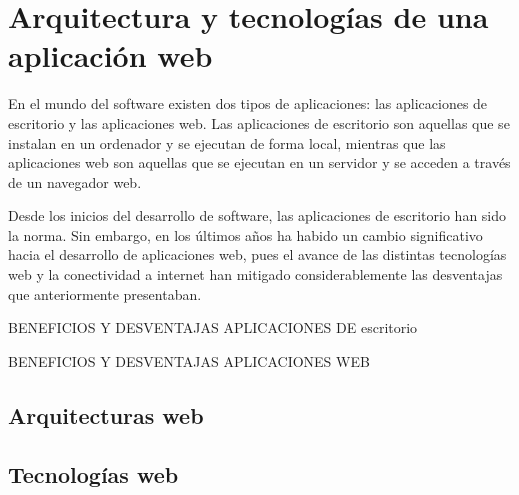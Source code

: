 \section{Arquitectura y tecnologías de una aplicación web}
\label{sec:arquitectura_sistema}

En el mundo del software existen dos tipos de aplicaciones: las aplicaciones de escritorio y las aplicaciones web. Las aplicaciones de escritorio son aquellas que se instalan en un ordenador y se ejecutan de forma local, mientras que las aplicaciones web son aquellas que se ejecutan en un servidor y se acceden a través de un navegador web.

Desde los inicios del desarrollo de software, las aplicaciones de escritorio han sido la norma. Sin embargo, en los últimos años ha habido un cambio significativo hacia el desarrollo de aplicaciones web, pues el avance de las distintas tecnologías web y la conectividad a internet han mitigado considerablemente las desventajas que anteriormente presentaban.

BENEFICIOS Y DESVENTAJAS APLICACIONES DE escritorio

BENEFICIOS Y DESVENTAJAS APLICACIONES WEB

\subsection{Arquitecturas web}

\subsection{Tecnologías web}